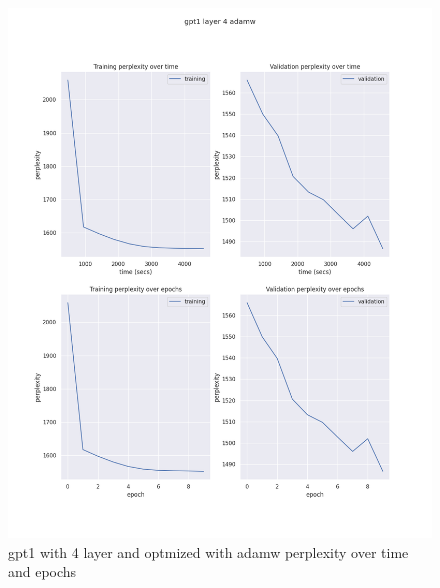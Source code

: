 \documentclass[12pt]{article}
\theoremstyle{definition}
\begin{document}
\begin{figure}[H]
     \centering
     \includegraphics[scale=0.4]{gpt1_layer_4_adamw.png}
     \caption{gpt1 with 4 layer and optmized with adamw perplexity over time and epochs}
\end{figure}
\end{document}
